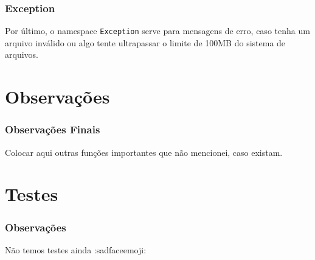 \documentclass{beamer}
\begin{document}
\begin{frame}
  \frametitle{Exception}
  Por último, o namespace \texttt{Exception} serve para mensagens de erro, caso tenha um arquivo inválido ou algo tente ultrapassar o limite de 100MB do sistema de arquivos.
\end{frame}

\section{Observações}

\begin{frame}
  \frametitle{Observações Finais}
  Colocar aqui outras funções importantes que não mencionei, caso existam.
\end{frame}

\section{Testes}

\begin{frame}
  \frametitle{Observações}
  Não temos testes ainda :sadfaceemoji:
\end{frame}

\end{document}
